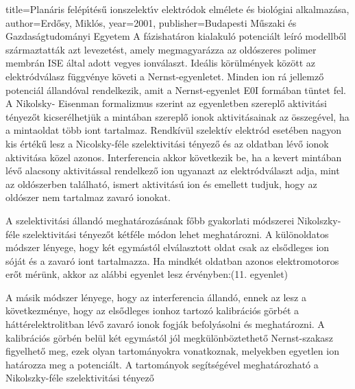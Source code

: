 {{  title={Plan{\'a}ris fel{\'e}p{\'\i}t{\'e}s{\H{u}} ionszelekt{\'\i}v elektr{\'o}dok elm{\'e}lete {\'e}s biol{\'o}giai alkalmaz{\'a}sa},
  author={Erd{\H{o}}sy, Mikl{\'o}s},
  year={2001},
  publisher={Budapesti M{\H{u}}szaki {\'e}s Gazdas{\'a}gtudom{\'a}nyi Egyetem}
}
A fázishatáron kialakuló potenciált leíró modellből származtatták azt levezetést, amely megmagyarázza az oldószeres polimer membrán ISE által adott vegyes ionválaszt. Ideális körülmények között az elektródválasz függvénye követi a Nernst-egyenletet. Minden ion rá jellemző potenciál állandóval rendelkezik, amit a Nernst-egyenlet E0I formában tüntet fel.  A Nikolsky- Eisenman formalizmus szerint az egyenletben szereplő aktivitási tényezőt kicserélhetjük a mintában szereplő ionok aktivitásainak az összegével, ha a mintaoldat több iont tartalmaz. Rendkívül szelektív elektród esetében nagyon kis értékű lesz a Nicolsky-féle szelektivitási tényező és az oldatban lévő ionok aktivitása közel azonos. Interferencia akkor következik be, ha a kevert mintában lévő alacsony aktivitással rendelkező ion ugyanazt az elektródválaszt adja, mint az oldószerben található, ismert aktivitású ion és emellett tudjuk, hogy az oldószer nem tartalmaz zavaró ionokat.


A szelektivitási állandó meghatározásának főbb gyakorlati módszerei
Nikolszky-féle szelektivitási tényezőt kétféle módon lehet meghatározni. A különoldatos módszer lényege, hogy két egymástól elválasztott oldat csak az elsődleges ion sóját és a zavaró iont tartalmazza.  Ha mindkét oldatban azonos elektromotoros erőt mérünk, akkor az alábbi egyenlet lesz érvényben:(11. egyenlet)

A másik módszer lényege, hogy az interferencia állandó, ennek az lesz a következménye, hogy az elsődleges ionhoz tartozó kalibrációs görbét a háttérelektrolitban lévő zavaró ionok fogják befolyásolni és meghatározni. A kalibrációs görbén belül két egymástól jól megkülönböztethető Nernst-szakasz figyelhető meg, ezek olyan tartományokra vonatkoznak, melyekben egyetlen ion határozza meg a potenciált. A tartományok segítségével meghatározható a Nikolszky-féle szelektivitási tényező 

}
